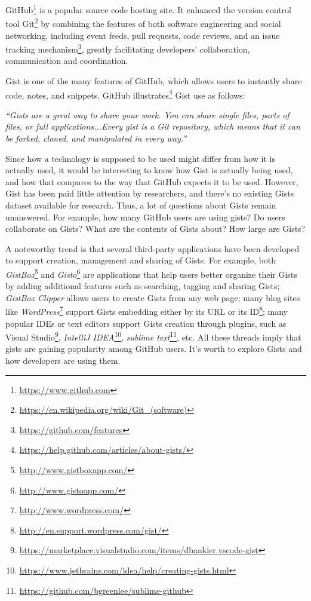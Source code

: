 
GitHub\footnote{\url{https://www.github.com}} is a popular source code hosting site. It enhanced the version control tool Git\footnote{\url{https://en.wikipedia.org/wiki/Git_(software)}} by combining the features of both software engineering and social networking, including event feeds, pull requests, code reviews,
and an issue tracking mechanism\footnote{\url{https://github.com/features}}, greatly facilitating developers' collaboration, communication and coordination.  

Gist is one of the many features of GitHub, which allows users to instantly share code, notes, and snippets. GitHub illustrates\footnote{\url{https://help.github.com/articles/about-gists/}} Gist use as follows:

\textsl{``Gists are a great way to share your work. You can share single files, parts of files, or full applications...Every gist is a Git repository, which means that it can be forked, cloned, and manipulated in every way.''}

Since how a technology is supposed to be used might differ from how it is actually used, it would be interesting to know how Gist is actually being used, and how that compares to the way that GitHub expects it to be used. However, Gist has been paid little attention by researchers, and there's no existing Gists dataset available for research. Thus, a lot of questions about Gists remain unanswered. For example, how many GitHub users are using gists? Do users collaborate on Gists? What are the contents of Gists about? How large are Gists? 

A noteworthy trend is that several third-party applications have been developed to support creation, management and sharing of Gists. For example, both \textit{GistBox}\footnote{\url{http://www.gistboxapp.com/}} and \textit{Gisto}\footnote{\url{http://www.gistoapp.com/}} are applications that help users better organize their Gists by adding additional features such as searching, tagging and sharing Gists; \textit{GistBox Clipper} allows users to create Gists from any web page; many blog sites like \textit{WordPress}\footnote{\url{http://www.wordpress.com/}} support Gists embedding either by its URL or its ID\footnote{\url{http://en.support.wordpress.com/gist/}}; many popular IDEs or text editors support Gists creation through plugins, such as Visual Studio\footnote{\url{https://marketplace.visualstudio.com/items/dbankier.vscode-gist}}, \textit{IntelliJ IDEA}\footnote{\url{https://www.jetbrains.com/idea/help/creating-gists.html}}, \textit{sublime text}\footnote{\url{https://github.com/bgreenlee/sublime-github}}, etc. All these threads imply that gists are gaining popularity among GitHub users. It's worth to explore Gists and how developers are using them.

